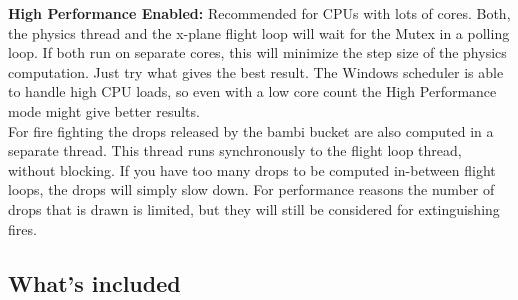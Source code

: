 \documentclass[10pt,a4]{scrartcl}
\begin{document}
\textbf{High Performance Enabled:} Recommended for CPUs with lots of cores. Both, the physics thread and the x-plane flight loop will wait for the Mutex in a polling loop. If both run on separate cores, this will minimize the step size of the physics computation.
Just try what gives the best result. The Windows scheduler is able to handle high CPU loads, so even with a low core count the High Performance mode might give better results.\\

For fire fighting the drops released by the bambi bucket are also computed in a separate thread. This thread runs synchronously to the flight loop thread, without blocking. If you have too many drops to be computed in-between flight loops, the drops will simply slow down. For performance reasons the number of drops that is drawn is limited, but they will still be considered for extinguishing fires.\\

\subsection{What's included}
\end{document}
